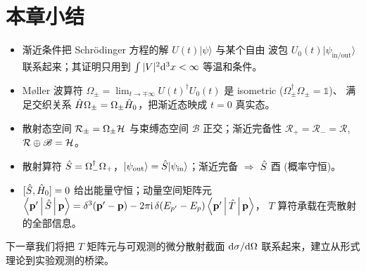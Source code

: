 \section{本章小结}
\label{sec:1P-summary}

\begin{itemize}
\item 渐近条件把 Schrödinger 方程的解 $U(t)|\psi\rangle$ 与某个自由
  波包 $U_0(t)|\psi_{\text{in/out}}\rangle$ 联系起来；其证明只用到
  $\int|V|^2\mathrm{d}^3x<\infty$ 等温和条件。
\item Møller 波算符 $\Omega_\pm = \lim_{t\to\mp\infty}U(t)^{\dagger}
  U_0(t)$ 是 isometric ($\Omega_\pm^{\dagger}\Omega_\pm=\mathbb{1}$)、
  满足交织关系 $\hat{H}\Omega_\pm=\Omega_\pm\hat{H}_0$，把渐近态映成
  $t=0$ 真实态。
\item 散射态空间 $\mathcal{R}_\pm=\Omega_\pm\mathcal{H}$ 与束缚态空间
  $\mathscr{B}$ 正交；渐近完备性 $\mathcal{R}_+=\mathcal{R}_-
  =\mathcal{R}$, $\mathcal{R}\oplus\mathscr{B}=\mathcal{H}$。
\item 散射算符 $\hat{S} = \Omega_-^{\dagger}\Omega_+$，$|\psi_{\text{out}}
  \rangle = \hat{S}|\psi_{\text{in}}\rangle$；渐近完备 $\Rightarrow$
  $\hat{S}$ 酉 (概率守恒)。
\item $[\hat{S},\hat{H}_0]=0$ 给出能量守恒；动量空间矩阵元
  $\left\langle \mathbf{p}' \,\middle|\, \hat{S} \,\middle|\, \mathbf{p} \right\rangle=\delta^3(\mathbf{p}'-\mathbf{p})
  -2\pi\mathrm{i}\,\delta(E_{p'}-E_p)\left\langle \mathbf{p}' \,\middle|\, \hat{T} \,\middle|\, \mathbf{p} \right\rangle$，
  $T$ 算符承载在壳散射的全部信息。
\end{itemize}

下一章我们将把 $T$ 矩阵元与可观测的微分散射截面 $\mathrm{d}\sigma/\mathrm{d}\Omega$
联系起来，建立从形式理论到实验观测的桥梁。
